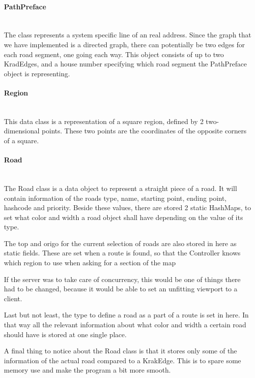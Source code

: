 \documentclass[a4paper,10pt,titlepage]{article}
\begin{document}
				\paragraph{PathPreface}\mbox{}\\				
The class represents a system specific line of an real address. Since the graph that we have implemented is a directed graph, there can potentially be two edges for each road segment, one going each way. This object consists of up to two KradEdges, and a house number specifying which road segment the PathPreface object is representing.

				\paragraph{Region}\mbox{}\\				
This data class is a representation of a square region, defined by 2 two-dimensional points. These two points are the coordinates of the opposite corners of a square.
				
				\paragraph{Road}\mbox{}\\				
The Road class is a data object to represent a straight piece of a road. It will contain information of the roads type, name, starting point, ending point, hashcode and priority. Beside these values, there are stored 2 static HashMaps, to set what color and width a road object shall have depending on the value of its type. 

The top and origo for the current selection of roads are also stored in here as static fields. These are set when a route is found, so that the Controller knows which region to use when asking for a section of the map

If the server was to take care of concurrency, this would be one of things there had to be changed, because it would be able to set an unfitting viewport to a client.

Last but not least, the type to define a road as a part of a route is set in here. In that way all the relevant information about what color and width a certain road should have is stored at one single place.

A final thing to notice about the Road class is that it stores only some of the information of the actual road compared to a KrakEdge. This is to spare some memory use and make the program a bit more smooth.
\end{document}
